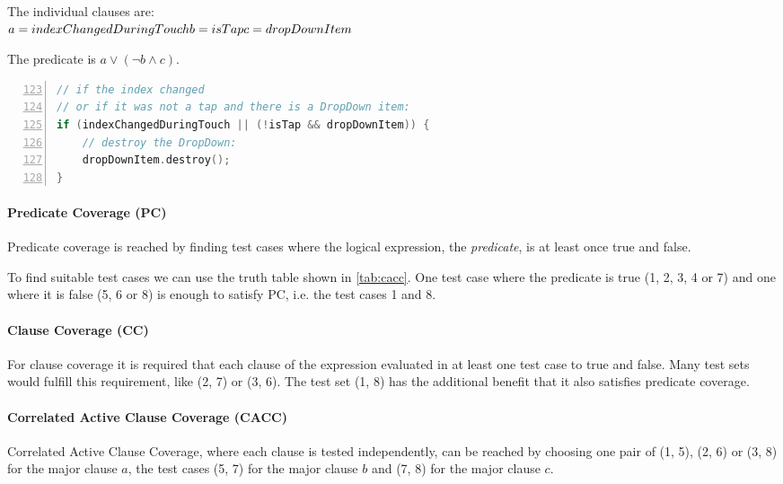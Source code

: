 \documentclass{scrreprt}
\begin{document}
The individual clauses are:\\
$
a = indexChangedDuringTouch\\
b = isTap\\
c = dropDownItem\\
$

The predicate is $a \lor (\lnot b \land c)$.

\bigskip
\begin{lstlisting}[language=C++,
					numbers=left,
					firstnumber=123,
					directivestyle={\color{black}}
					emph={int,char,double,float,unsigned},
					emphstyle={\color{blue}},
					caption=qml/CustomControls/ComboBox2.qml,
					label=lst:logical_expression_code]
// if the index changed
// or if it was not a tap and there is a DropDown item:
if (indexChangedDuringTouch || (!isTap && dropDownItem)) {
	// destroy the DropDown:
	dropDownItem.destroy();
}
\end{lstlisting}
\bigskip

\paragraph{Predicate Coverage (PC)}

Predicate coverage is reached by finding test cases where the logical expression, the \textit{predicate}, is at least once true and false.

To find suitable test cases we can use the truth table shown in \vref{tab:cacc}. One test case where the predicate is true (1, 2, 3, 4 or 7) and one where it is false (5, 6 or 8) is enough to satisfy PC, i.e. the test cases 1 and 8.

\paragraph{Clause Coverage (CC)}

For clause coverage it is required that each clause of the expression evaluated in at least one test case to true and false. Many test sets would fulfill this requirement, like (2, 7) or (3, 6). The test set (1, 8) has the additional benefit that it also satisfies predicate coverage.

\paragraph{Correlated Active Clause Coverage (CACC)}

Correlated Active Clause Coverage, where each clause is tested independently, can be reached by choosing one pair of (1, 5), (2, 6) or (3, 8) for the major clause $a$, the test cases (5, 7) for the major clause $b$ and (7, 8) for the major clause $c$.
\end{document}
